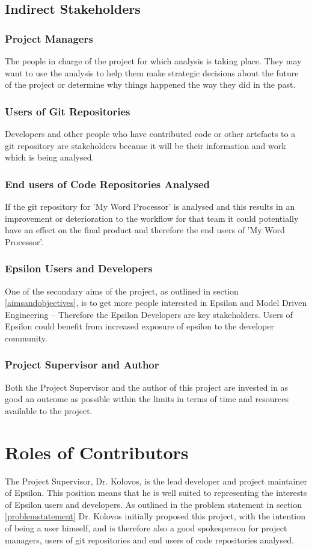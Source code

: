 \documentclass[11pt]{book}
\begin{document}
\subsection{Indirect Stakeholders}
\subsubsection{Project Managers}
The people in charge of the project for which analysis is taking place. They may want to use the analysis to help them make strategic decisions about the future of the project or determine why things happened the way they did in the past.

\subsubsection{Users of Git Repositories}
Developers and other people who have contributed code or other artefacts to a git repository are stakeholders because it will be their information and work which is being analysed.

\subsubsection{End users of Code Repositories Analysed}
If the git repository for 'My Word Processor' is analysed and this results in an improvement or deterioration to the workflow for that team it could potentially have an effect on the final product and therefore the end users of 'My Word Processor'. 

\subsubsection{Epsilon Users and Developers}
One of the secondary aims of the project, as outlined in section \ref{aimsandobjectives}, is to get more people interested in Epsilon and Model Driven Engineering -- Therefore the Epsilon Developers are key stakeholders. Users of Epsilon could benefit from increased exposure of epsilon to the developer community.

\subsubsection{Project Supervisor and Author}
Both the Project Supervisor and the author of this project are invested in as good an outcome as possible within the limits in terms of time and resources available to the project. 

\section{Roles of Contributors}
The Project Supervisor, Dr. Kolovos, is the lead developer and project maintainer of Epsilon. This position means that he is well suited to representing the interests of Epsilon users and developers. As outlined in the problem statement in section \ref{problemstatement} Dr. Kolovos initially proposed this project, with the intention of being a user himself, and is therefore also a good spokesperson for project managers, users of git repositories and end users of code repositories analysed.
\end{document}
